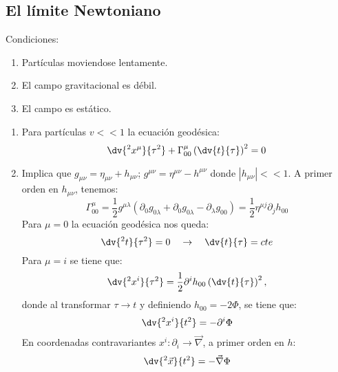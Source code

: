 \documentclass[../main]{subfiles}
\begin{document}
\begin{adjustwidth}{0pt}{-100pt}
\section{El límite Newtoniano}\label{part3.5}

Condiciones:
\begin{enumerate}
    \item Partículas moviendose lentamente.
    \item El campo gravitacional es débil.
    \item El campo es estático.
\end{enumerate}

\begin{enumerate}
    \item Para partículas $v<<1$ la ecuación geodésica:
    \begin{equation}
        \dv{^2 x^{\mu}}{\tau^2}+\Gamma^{\mu}_{00}\left(\dv{t}{\tau}\right)^2=0
    \end{equation}
    \item Implica que $g_{\mu\nu}=\eta_{\mu\nu}+h_{\mu\nu}$; $g^{\mu\nu}=\eta^{\mu\nu}-h^{\mu\nu}$ donde $|h_{\mu\nu}|<<1$. A primer orden en $h_{\mu\nu}$, tenemos:
    \begin{equation}
        \Gamma^{\mu}_{00}=\dfrac{1}{2}g^{\mu\lambda}(\partial_0 g_{0\lambda}+\partial_0 g_{0\lambda}-\partial_{\lambda}g_{00})=\dfrac{1}{2}\eta^{\mu j}\partial_j h_00
    \end{equation}
    Para $\mu=0$ la ecuación geodésica nos queda:
    \begin{equation}
        \dv{^2 t}{\tau^2}=0 \quad \rightarrow \quad \dv{t}{\tau}=cte
    \end{equation}
    Para $\mu=i$ se tiene que:
    \begin{equation}
        \dv{^2 x^{i}}{\tau^2}=\dfrac{1}{2}\partial^{i}h_{00}\left(\dv{t}{\tau}\right)^2,
    \end{equation}
    donde al transformar $\tau \rightarrow t$ y definiendo $h_{00}=-2\Phi$, se tiene que:
    \begin{equation}
        \dv{^2 x^{i}}{t^2}=-\partial^{i}\Phi
    \end{equation}
    En coordenadas contravariantes $x^{i}:\partial_i \rightarrow \vec{\nabla}$, a primer orden en $h$:
    \begin{equation}
        \dv{^2 \vec{x}}{t^2}=-\vec{\nabla}\Phi
    \end{equation}
\end{enumerate}

\end{adjustwidth}
\end{document}
